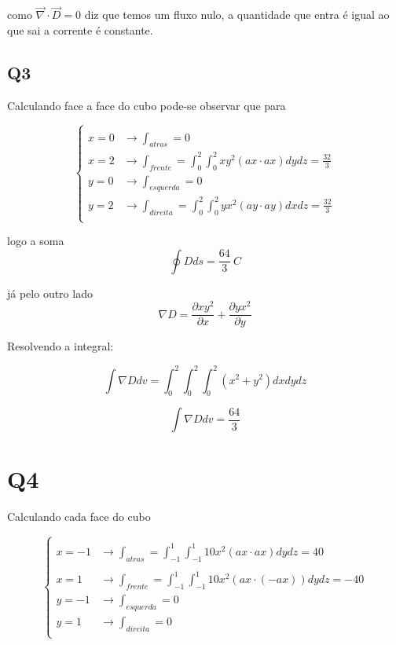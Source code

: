 \documentclass[11pt]{article}
\begin{document}
    como \(\vec{\nabla} \cdot \vec{D} = 0\) diz que temos um fluxo nulo, a
quantidade que entra é igual ao que sai a corrente é constante.

    \hypertarget{q3}{%
\subsection{Q3}\label{q3}}

    Calculando face a face do cubo pode-se observar que para

$$    \begin{cases}
\\
x=0 &\rightarrow \displaystyle\int_{atras} =0 \\
x=2 &\rightarrow \displaystyle\int_{frente} =\int_0^2\int_0^2 xy^2 (ax \cdot ax) dydz = \frac{32}{3}\\
y=0 &\rightarrow \displaystyle\int_{esquerda} =0 \\
y=2 &\rightarrow \displaystyle\int_{direita} = \int_0^2\int_0^2 yx^2 (ay \cdot ay) dxdz = \frac{32}{3}\\
\end{cases}$$

logo a soma \[\oint Dds = \frac{64}{3} \ C\]

    já pelo outro lado
\[ \nabla D = \frac{\partial xy^2}{\partial x} + \frac{\partial yx^2}{\partial y}\]

    Resolvendo a integral:

\[ \int \nabla D dv = \int_0^2\int_0^2\int_0^2 (x^2+y^2) dxdydz \]

\[ \int \nabla D dv = \frac{64}{3} \]

    \hypertarget{q4}{%
\section{Q4}\label{q4}}

    Calculando cada face do cubo

$$\begin{cases}
\\
x=-1 &\rightarrow \displaystyle\int_{atras} =\int_{-1}^1\int_{-1}^1 10x^2 (ax \cdot ax) dydz = 40\\ \\
x=1 &\rightarrow \displaystyle\int_{frente} =\int_{-1}^1\int_{-1}^1 10x^2 (ax \cdot (-ax)) dydz = -40\\
y=-1 &\rightarrow \displaystyle\int_{esquerda} =0 \\
y=1 &\rightarrow \displaystyle\int_{direita} = 0\\
\end{cases}$$
\end{document}
